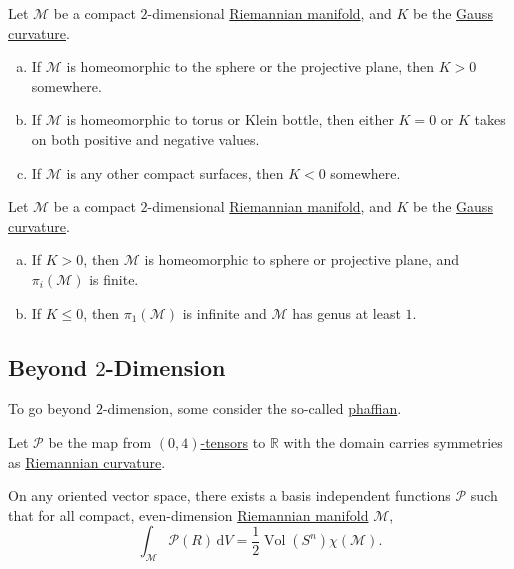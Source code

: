 \begin{corollary}
	Let \(\mathcal{M} \) be a compact \(2\)-dimensional \hyperref[def:Riemannian-manifold]{Riemannian manifold}, and \(K\) be the \hyperref[rmk:Gauss-curvature]{Gauss curvature}.
	\begin{enumerate}[(a)]
		\item If \(\mathcal{M} \) is homeomorphic to the sphere or the projective plane, then \(K > 0\) somewhere.
		\item If \(\mathcal{M} \) is homeomorphic to torus or Klein bottle, then either \(K = 0\) or \(K\) takes on both positive and negative values.
		\item If \(\mathcal{M} \) is any other compact surfaces, then \(K < 0\) somewhere.
	\end{enumerate}
\end{corollary}

\begin{corollary}
	Let \(\mathcal{M} \) be a compact \(2\)-dimensional \hyperref[def:Riemannian-manifold]{Riemannian manifold}, and \(K\) be the \hyperref[rmk:Gauss-curvature]{Gauss curvature}.
	\begin{enumerate}[(a)]
		\item If \(K > 0\), then \(\mathcal{M} \) is homeomorphic to sphere or projective plane, and \(\pi _i(\mathcal{M} )\) is finite.
		\item If \(K \leq 0\), then \(\pi _1(\mathcal{M} )\) is infinite and \(\mathcal{M} \) has genus at least \(1\).
	\end{enumerate}
\end{corollary}

\subsection{Beyond \(2\)-Dimension}
To go beyond \(2\)-dimension, some consider the so-called \hyperref[def:phaffian]{phaffian}.

\begin{definition}[Pfaffian]\label{def:phaffian}
	Let \(\mathcal{P} \) be the map from \hyperref[def:tensor-field]{\((0, 4)\)-tensors} to \(\mathbb{R} \) with the domain carries symmetries as \hyperref[def:Riemannian-curvature]{Riemannian curvature}.
\end{definition}

\begin{theorem}\label{thm:phaffian}
	On any oriented vector space, there exists a basis independent functions \(\mathcal{P} \) such that for all compact, even-dimension \hyperref[def:Riemannian-manifold]{Riemannian manifold} \(\mathcal{M} \),
	\[
		\int _\mathcal{M} \mathcal{P} (R)\,\mathrm{d} V = \frac{1}{2} \mathop{\mathrm{Vol}}(S^n) \chi (\mathcal{M} ) .
	\]
\end{theorem}

